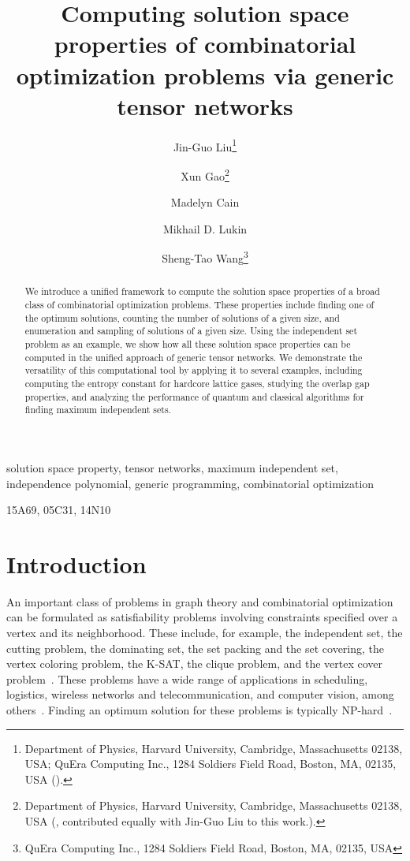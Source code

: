 \documentclass[onefignum, onetabnum]{siamart190516}
\title{Computing solution space properties of combinatorial optimization problems via generic tensor networks
}
\author{
Jin-Guo Liu\thanks{Department of Physics, Harvard University, Cambridge, Massachusetts 02138, USA; QuEra Computing Inc., 1284 Soldiers Field Road, Boston, MA, 02135, USA  %
    (\email{jinguoliu@g.harvard.edu}).}
\and {Xun Gao}\thanks{Department of Physics, Harvard University, Cambridge, Massachusetts 02138, USA (\email{xungao@g.harvard.edu}, contributed equally with Jin-Guo Liu to this work.).}
\and Madelyn Cain\footnotemark[2]
\and Mikhail D. Lukin\footnotemark[2]
\and Sheng-Tao Wang\thanks{QuEra Computing Inc., 1284 Soldiers Field Road, Boston, MA, 02135, USA}
}
\newcommand{\<}{\langle}
\renewcommand{\>}{\rangle}
\newcounter{example}
\begin{document}
\maketitle

\begin{abstract}
We introduce a unified framework to compute the solution space properties of a broad class of combinatorial optimization problems. These properties include finding one of the optimum solutions, counting the number of solutions of a given size, and enumeration and sampling of solutions of a given size. Using the independent set problem as an example, we show how all these solution space properties can be computed in the unified approach of generic tensor networks. We demonstrate the versatility of this computational tool by applying it to several  examples, including computing the entropy constant for hardcore lattice gases, studying the overlap gap properties, and analyzing the performance of quantum and classical algorithms for finding maximum independent sets.
\end{abstract}

\begin{keywords}
solution space property, tensor networks, maximum independent set, independence polynomial, generic programming, combinatorial optimization 
\end{keywords}

\begin{AMS}
  15A69, 05C31, 14N10
\end{AMS}

\section{Introduction}

An important class of problems in graph theory and combinatorial optimization  can be formulated as satisfiability problems involving constraints specified over a vertex and its neighborhood.
These include, for example, the independent set, the cutting problem, the dominating set, the set packing and  the set covering, the vertex coloring problem, the K-SAT,  the clique problem, and the vertex cover problem~\cite{Moore2011}.
These problems have a wide range of applications in scheduling, logistics,
wireless networks and telecommunication, and computer vision, among others~\cite{Butenko2003, Wu2015}.
Finding an optimum solution for these problems is typically NP-hard~\cite{Hastad1996}.
\end{document}
